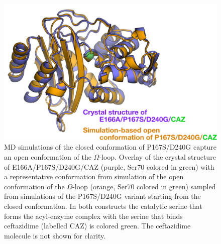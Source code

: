\documentclass[../main.tex]{subfiles}
\begin{document}
    \begin{figure}[!htb] %
        \centering
        \includegraphics[width=5in]{ch2-suppfig3.png}
        \caption[MD simulations of the closed conformation of P167S/D240G capture an open conformation of the $\Omega$-loop.]{MD simulations of the closed conformation of P167S/D240G capture an open conformation of the $\Omega$-loop. Overlay of the crystal structure of E166A/P167S/D240G/CAZ (purple, Ser70 colored in green) with a representative conformation from simulation of the open conformation of the $\Omega$-loop (orange, Ser70 colored in green) sampled from simulations of the P167S/D240G variant starting from the closed conformation. In both constructs the catalytic serine that forms the acyl-enzyme complex with the serine that binds ceftazidime (labelled CAZ) is colored green. The ceftazidime molecule is not shown for clarity.}
        \label{fig:ch2-suppfig3}
    \end{figure} 
	
	
\end{document}
